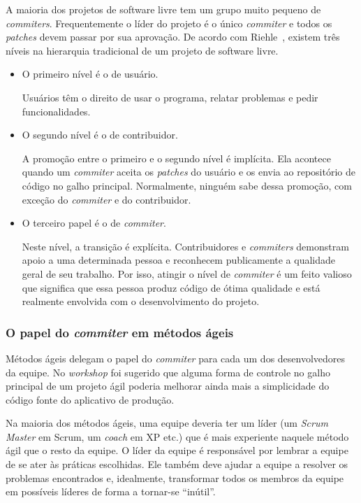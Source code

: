A maioria dos projetos de software livre tem um grupo muito pequeno de
\emph{commiters}. Frequentemente o líder do projeto é o único
\emph{commiter} e todos os \emph{patches} devem passar por sua
aprovação. De acordo com Riehle~\cite{Riehle2007}, existem três níveis
na hierarquia tradicional de um projeto de software livre.

\begin{itemize}
\item O primeiro nível é o de usuário.

  Usuários têm o direito de usar o programa, relatar problemas e pedir
  funcionalidades.
\item O segundo nível é o de contribuidor.

  A promoção entre o primeiro e o segundo nível é implícita. Ela
  acontece quando um \emph{commiter} aceita os \emph{patches} do
  usuário e os envia ao repositório de código no galho
  principal. Normalmente, ninguém sabe dessa promoção, com exceção do
  \emph{commiter} e do contribuidor.
\item O terceiro papel é o de \emph{commiter}.

  Neste nível, a transição é explícita. Contribuidores e
  \emph{commiters} demonstram apoio a uma determinada pessoa e
  reconhecem publicamente a qualidade geral de seu trabalho. Por isso,
  atingir o nível de \emph{commiter} é um feito valioso que significa
  que essa pessoa produz código de ótima qualidade e está realmente
  envolvida com o desenvolvimento do projeto.
\end{itemize}

\subsubsection{O papel do \emph{commiter} em métodos ágeis}

Métodos ágeis delegam o papel do \emph{commiter} para cada um dos
desenvolvedores da equipe. No \emph{workshop} foi sugerido que alguma
forma de controle no galho principal de um projeto ágil poderia
melhorar ainda mais a simplicidade do código fonte do aplicativo de
produção.


Na maioria dos métodos ágeis, uma equipe deveria ter um líder (um
\emph{Scrum Master} em Scrum, um \emph{coach} em XP etc.)  que é mais
experiente naquele método ágil que o resto da equipe. O líder da
equipe é responsável por lembrar a equipe de se ater às práticas
escolhidas. Ele também deve ajudar a equipe a resolver os problemas
encontrados e, idealmente, transformar todos os membros da equipe em
possíveis líderes de forma a tornar-se ``inútil''.

